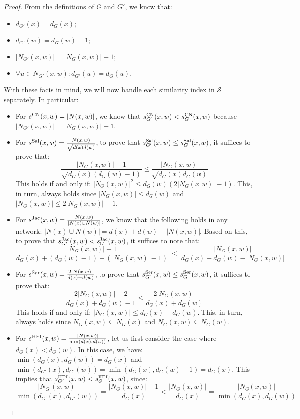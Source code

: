 \documentclass[twocolumn]{article}
\newcommand{\sCN}{s^{\text{\normalfont CN}}}
\newcommand{\sSal}{s^{\text{\normalfont Sal}}}
\newcommand{\sJac}{s^{\text{\normalfont Jac}}}
\newcommand{\sSor}{s^{\text{\normalfont S{\o}r}}}
\newcommand{\sHPI}{s^{\text{\normalfont HPI}}}
\begin{document}
\begin{proof}
From the definitions of $G$ and $G'$, we know that:
\begin{itemize}
\item $d_{G'}(x) = d_{G}(x)$;
\item $d_{G'}(w) = d_{G}(w)-1$;
\item $\left|N_{G'}(x,w)\right| = \left|N_{G}(x,w)\right|-1$;
\item $\forall u\in N_{G'}(x,w): d_{G'}(u) = d_G(u)$.
\end{itemize}
With these facts in mind, we will now handle each similarity index in $\mathcal{S}$ separately. In particular:

\begin{itemize}
\item For $\sCN(x,w)=|N(x,w)|$, we know that $\sCN_{G'}(x,w)< \sCN_{G}(x,w)$ because $\left|N_{G'}(x,w)\right| = \left|N_{G}(x,w)\right| - 1$.
%
\item For $\sSal(x,w)=\frac{|N(x,w)|}{\sqrt{d(x) d(w)}}$, to prove that $\sSal_{G'}(x,w)\leq \sSal_G(x,w)$, it suffices to prove that:
$$
\frac{|N_G(x,w)|-1}{\sqrt{d_G(x) (d_G(w)-1)}}\leq \frac{|N_G(x,w)|}{\sqrt{d_G(x) d_G(w)}}
$$
This holds if and only if: $|N_G(x,w)|^2 \leq d_G(w)(2|N_G(x,w)|-1)$. This, in turn, always holds since $|N_G(x,w)| \leq d_G(w)$ and $|N_G(x,w)| \leq 2|N_G(x,w)|-1$.
%
\item For $\sJac(x,w)=\frac{|N(x,w)|}{|N(x) \cup N(w)|}$, we know that the following holds in any network: $|N(x) \cup N(w)| = d(x)+d(w)-|N(x,w)|$. Based on this, to prove that $\sJac_{G'}(x,w)< \sJac_G(x,w)$, it suffices to note that:
$$
\frac{|N_G(x,w)|-1}{d_G(x)+(d_G(w)-1)-(|N_G(x,w)|-1)}\ <\ \frac{|N_G(x,w)|}{d_G(x)+d_G(w)-|N_G(x,w)|}
$$
%
\item For $\sSor(x,w)=\frac{2|N(x,w)|}{d(x) + d(w)}$, to prove that $\sSor_{G'}(x,w)\leq \sSor_G(x,w)$, it suffices to prove that:
$$
\frac{2|N_G(x,w)|-2}{d_G(x) + d_G(w)-1}\leq \frac{2|N_G(x,w)|}{d_G(x) + d_G(w)}
$$
This holds if and only if: $|N_G(x,w)|\leq d_G(x) + d_G(w)$. This, in turn, always holds since $N_G(x,w)\subseteq N_G(x)$ and $N_G(x,w)\subseteq N_G(w)$.
%
\item For $\sHPI(x,w)=\frac{|N(x,w)|}{\min(d(x),d(w))}$, let us first consider the case where $d_G(x)<d_G(w)$. In this case, we have: $\min(d_G(x),d_G(w))=d_G(x)$ and $\min(d_{G'}(x),d_{G'}(w))=\min(d_{G}(x),d_{G}(w)-1)=d_{G}(x)$. This implies that $\sHPI_{G'}(x,w)< \sHPI_G(x,w)$, since:
$$
\frac{|N_{G'}(x,w)|}{\min(d_{G'}(x),d_{G'}(w))} = \frac{|N_{G}(x,w)|-1}{d_G(x)} < \frac{|N_G(x,w)|}{d_{G}(x)} = \frac{|N_G(x,w)|}{\min(d_G(x),d_G(w))}
$$
\end{itemize}
\end{proof}
\end{document}
